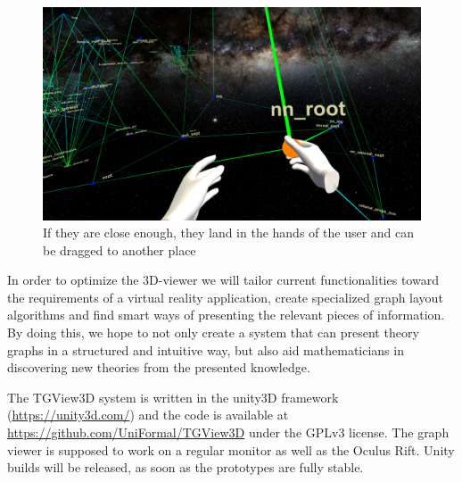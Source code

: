 \documentclass{llncs}
\begin{document}
\begin{figure}\centering
    \includegraphics[width=1\textwidth ]{grab}
    \caption{If they are close enough, they land in the hands of the user and can be dragged to another place}
    \label{fig:sample_figure4}
\end{figure}

In order to optimize the 3D-viewer we will tailor current functionalities toward the
requirements of a virtual reality application, create specialized graph layout algorithms
and find smart ways of presenting the relevant pieces of information. By doing this, we
hope to not only create a system that can present theory graphs in a structured and
intuitive way, but also aid mathematicians in discovering new theories from the presented
knowledge.

The TGView3D system is written in the unity3D framework (\url{https://unity3d.com/}) and the code is available at \url{https://github.com/UniFormal/TGView3D} under the GPLv3 license.
The graph viewer is supposed to work on a regular monitor as well as the Oculus Rift. Unity builds will be released, as soon as the prototypes are fully stable.

\printbibliography
\end{document}
